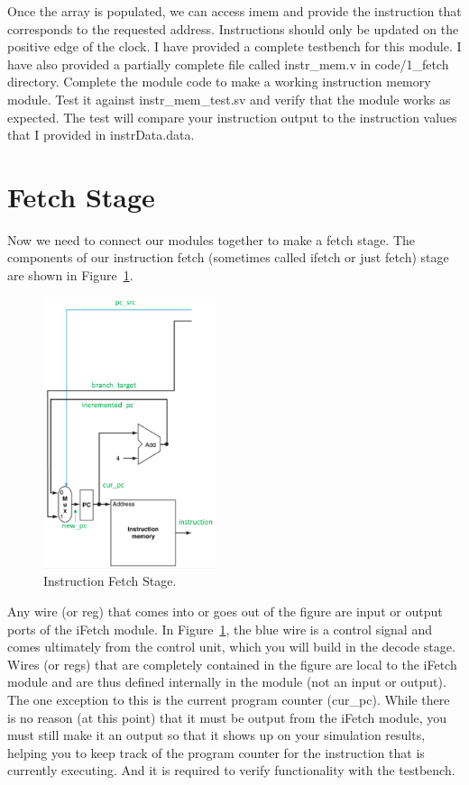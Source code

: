 Once the array is populated, we can access imem and provide the instruction that corresponds to the requested address.  Instructions should only be updated on the positive edge of the clock.  I have provided a complete testbench for this module.  I have also provided a partially complete file called instr\_mem.v in code/1\_fetch directory.  Complete the module code to make a working instruction memory module.  Test it against instr\_mem\_test.sv and verify that the module works as expected.  The test will compare your instruction output to the instruction values that I provided in instrData.data. 

\section{Fetch Stage}
Now we need to connect our modules together to make a fetch stage.  The components of our instruction fetch (sometimes called ifetch or just fetch) stage are shown in Figure~\ref{fig:fetch}.

\begin{figure}
\caption{Instruction Fetch Stage.}\label{fig:fetch}
\begin{center}
\includegraphics[width=2in]{../images/pipeline_fetch.png}
\end{center}
\end{figure}

Any wire (or reg) that comes into or goes out of the figure are input or output ports of the iFetch module.  In Figure~\ref{fig:fetch}, the blue wire is a control signal and comes ultimately from the control unit, which you will build in the decode stage.   Wires (or regs) that are completely contained in the figure are local to the iFetch module and are thus defined internally in the module (not an input or output).  The one exception to this is the current program counter (cur\_pc).  While there is no reason (at this point) that it must be output from the iFetch module, you must still make it an output so that it shows up on your simulation results, helping you to keep track of the program counter for the instruction that is currently executing.  And it is required to verify functionality with the testbench.

